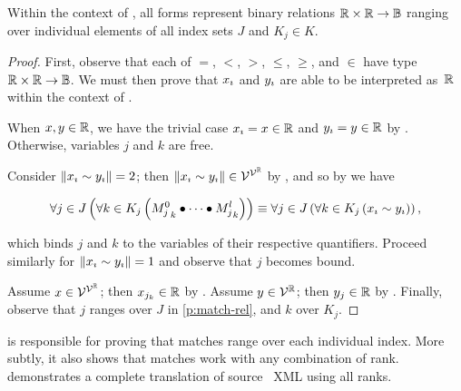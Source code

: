 \begin{theorem}
  Within the context of ,
    all  forms represent binary relations
      $\mathbb{R}\times\mathbb{R}\rightarrow\mathbb{B}$
    ranging over individual elements of all index sets $J$ and $K_j\in K$.
\end{theorem}
\begin{proof}
  First,
    observe that each of $=$, $<$, $>$, $\leq$, $\geq$, and $\in$
    have type $\mathbb{R}\times\mathbb{R}\rightarrow\mathbb{B}$.
  We must then prove that ${x}_{\imath}$ and ${y}_{\imath}$ are able to be
    interpreted as~$\mathbb{R}$ within the context of .

  When $x,y\in\mathbb{R}$,
    we have the trivial case ${x}_{\imath}=x\in\mathbb{R}$ and ${y}_{\imath}=y\in\mathbb{R}$
    by .
  Otherwise,
    variables $j$ and $k$ are free.

  Consider $\left\|{x}_{\imath} \sim {y}_{\imath}\right\| = 2$;
    then $\left\|{x}_{\imath} \sim {y}_{\imath}\right\| \in\mathcal{V}^{\mathcal{V}^{\mathbb{R}}}$ by ,
      and so by  we have

  \begin{equation}\label{p:match-rel}
    \Forall{j\in J}{\Forall{k\in K_j}{\cpredmatseq}}
      \equiv
      \Forall{j\in J}{\Forall{k\in K_j}{\varsub x \sim \varsub y}},
  \end{equation}

  \noindent
  which binds $j$ and $k$ to the variables of their respective quantifiers.
  Proceed similarly for $\left\|{x}_{\imath} \sim {y}_{\imath}\right\| = 1$ and observe that
    $j$ becomes bound.

  Assume $x\in\mathcal{V}^{\mathcal{V}^{\mathbb{R}}}$;
    then $x_{j_k}\in\mathbb{R}$ by .
  Assume $y\in\mathcal{V}^{\mathbb{R}}$;
    then $y_j\in\mathbb{R}$ by .
  Finally,
    observe that $j$ ranges over $J$ in \ref{p:match-rel},
      and $k$ over $K_j$.
\end{proof}

 is responsible for proving that matches range over each
  individual index.
More subtly,
  it also shows that matches work with any combination of rank.
 demonstrates a complete translation of
  source \tame{}~XML using all ranks.

